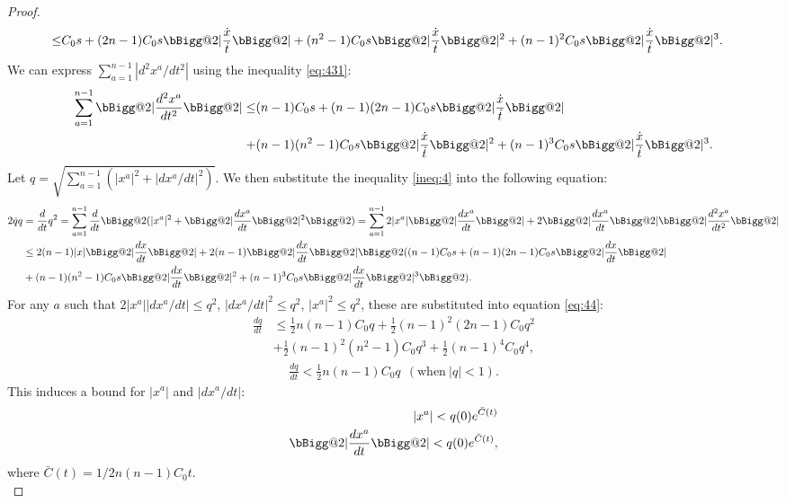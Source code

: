 \documentclass[pdflatex,sn-mathphys-num]{sn-jnl}
\makeatletter
\newcommand{\vast}{\bBigg@{2}}
\theoremstyle{definition}
\makeatother
\begin{document}
\begin{proof}
\begin{align}
    \leq& C_0s + (2n-1)C_0s\vast|\frac{\dot{{x}}}{\dot{t}}\vast| +  (n^2 - 1)C_0s\vast|\frac{\dot{{x}}}{\dot{t}}\vast|^2 + (n-1)^2C_0s\vast|\frac{\dot{{x}}}{\dot{t}}\vast|^3.
\end{align}
We can express $\sum_{a=1}^{n-1}|d^2x^a/dt^2|$ using the inequality \ref{eq:431}:
\begin{align}\label{ineq:4}
    \sum_{a=1}^{n-1}\vast|\frac{d^2x^a}{dt^2}\vast| \leq& (n-1)C_0s + (n-1)(2n-1)C_0s\vast|\frac{\dot{{x}}}{\dot{t}}\vast|  \nonumber\\
    + & (n-1)(n^2-1)C_0s\vast|\frac{\dot{{x}}}{\dot{t}}\vast|^2 + (n-1)^3C_0s\vast|\frac{\dot{{x}}}{\dot{t}}\vast|^3 .
\end{align}
Let $q = \sqrt{\sum_{a = 1}^{n-1}(|x^a|^2 +  |dx^a/dt|^2)}$. We then substitute the inequality \ref{ineq:4} into the following equation:
\begin{align}
     2\dot{q}q &= \frac{d}{dt}q^2 = \sum_{a=1}^{n-1}\frac{d}{dt}\vast(|x^a|^2 + \vast|\frac{dx^a}{dt}\vast|^2\vast) = \sum_{a=1}^{n-1}2|x^a|\vast|\frac{dx^a}{dt}\vast| + 2\vast|\frac{dx^a}{dt}\vast|\vast|\frac{d^2x^a}{dt^2}\vast| \nonumber \\
    & \leq 2(n-1)|x|\vast|\frac{dx}{dt}\vast| + 2(n-1)\vast|\frac{dx}{dt}\vast|\vast((n-1)C_0s + (n-1)(2n-1)C_0s\vast|\frac{dx}{dt}\vast|  \nonumber\\
    & +  (n-1)(n^2-1)C_0s\vast|\frac{dx}{dt}\vast|^2 + (n-1)^3C_0s\vast|\frac{dx}{dt}\vast|^3\vast). \label{eq:44}
\end{align}
For any $a$ such that $2|x^{a}||dx^{a}/dt| \leq q^2$, $|dx^{a}/dt|^2 \leq q^2$, $|x^{a}|^2 \leq q^2$, these are substituted into equation \ref{eq:44}:
\begin{align}
    \frac{dq}{dt}& \leq \frac{1}{2}n(n-1)C_0q + \frac{1}{2}(n-1)^2(2n-1)C_0q^2  \nonumber\\
    &+ \frac{1}{2}(n-1)^2(n^2-1)C_0q^3 + \frac{1}{2}(n-1)^4C_0q^4\label{eq:45},
\end{align}
\begin{align}
    \frac{dq}{dt} < \frac{1}{2}n(n-1)C_0q ~~(\text{when}~|q| < 1).
\end{align}
This induces a bound for $|x^a|$ and $|dx^a/dt|$:
\begin{align}
    |x^a| < q(0)e^{\bar{C}(t)}\label{eq:47}\\
    \vast|\frac{dx^a}{dt}\vast| < q(0)e^{\bar{C}(t)},\label{eq:48}
\end{align}
where $\bar{C}(t) = 1/2n(n-1)C_0t$. \\


\end{proof}
\end{document}

